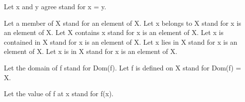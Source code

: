 \begin{forthel}
  Let x and y agree stand for x = y.

  Let a member of X stand for an element of X.
  Let x belongs to X stand for x is an element of X.
  Let X contains x stand for x is an element of X.
  Let x is contained in X stand for x is an element of X.
  Let x lies in X stand for x is an element of X.
  Let x is in X stand for x is an element of X.

  Let the domain of f stand for Dom(f).
  Let f is defined on X stand for Dom(f) = X.

  Let the value of f at x stand for f(x).
\end{forthel}
